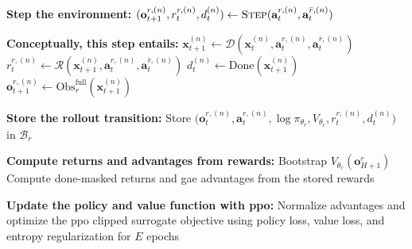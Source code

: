 \begin{algorithm}[H]
\begin{algorithmic}[1]
    \State \textbf{Step the environment:}
    \State \hspace{1em} $(\mathbf{o}_{t+1}^{r,(n)}, r_t^{r,(n)}, d_t^{(n)}) \leftarrow \textsc{Step}(\mathbf{a}_t^{r,(n)}, \mathbf{a}_t^{\bar r,(n)})$

    \State \textbf{Conceptually, this step entails:}
    \State \hspace{2em} $\mathbf{x}_{t+1}^{(n)} \leftarrow \mathcal{D}\!\left(\mathbf{x}_t^{(n)}, \mathbf{a}_t^{r,(n)}, \mathbf{a}_t^{\bar r,(n)}\right)$
    \State \hspace{2em} $r_t^{r,(n)} \leftarrow \mathcal{R}\!\left(\mathbf{x}_{t+1}^{(n)}, \mathbf{a}_t^{r,(n)}, \mathbf{a}_t^{\bar r,(n)}\right)$
    \State \hspace{2em} $d_t^{(n)} \leftarrow \mathrm{Done}\!\left(\mathbf{x}_{t+1}^{(n)}\right)$
    \State \hspace{2em} $\mathbf{o}_{t+1}^{r,(n)} \leftarrow \mathrm{Obs}^{\mathrm{full}}_r(\mathbf{x}_{t+1}^{(n)})$

    \State \textbf{Store the rollout transition:}
    \State \hspace{1em} Store $\big(\mathbf{o}_t^{r,(n)}, \mathbf{a}_t^{r,(n)}, \log \pi_{\theta_r}, V_{\theta_r}, r_t^{r,(n)}, d_t^{(n)}\big)$ in $\mathcal{B}_r$
  \EndFor

  \State \textbf{Compute returns and advantages from rewards:}
  \State \hspace{1em} Bootstrap $V_{\theta_r}(\mathbf{o}_{H+1}^r)$
    \State \hspace{1em} Compute done-masked returns and \acs{gae} advantages from the stored rewards

  \State \textbf{Update the policy and value function with \acs{ppo}:}
  \State \hspace{1em} Normalize advantages and optimize the \acs{ppo} clipped surrogate objective
  \State \hspace{1em} using policy loss, value loss, and entropy regularization for $E$ epochs
\EndFor
\end{algorithmic}
\end{algorithm}


